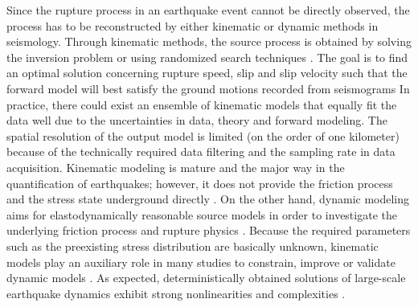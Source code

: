 \documentclass[%
 aip,
rsi,%
 amsmath,amssymb,
 reprint,%
]{revtex4-1}
\begin{document}
Since the rupture process in an earthquake event cannot be directly observed, the process has to be reconstructed by either kinematic or dynamic methods in seismology.
Through kinematic methods, the source process is obtained by solving the inversion problem or using randomized search techniques \cite{monelli_bayesian_2008}.
The goal is to find an optimal solution concerning rupture speed, slip and slip velocity such that the forward model will best satisfy the ground motions recorded from seismograms \cite{olson_finite_1982, haskell_elastic_1969, ozgun_konca_kinematic_2013}
In practice, there could exist an ensemble of kinematic models that equally fit the data well due to the uncertainties in data, theory and forward modeling\cite{monelli_bayesian_2008, peyrat_nonlinear_2004}.
The spatial resolution of the output model is limited (on the order of one kilometer) because of the technically required data filtering and the sampling rate in data acquisition\cite{hartzell_inversion_1983,madariaga_seismic_2007,madariaga_earthquake_2002,wald_rupture_1991}.
Kinematic modeling is mature and the major way in the quantification of earthquakes\cite{madariaga_earthquake_2002,ide_4.09-slip_2015}; however, it does not provide the friction process and the stress state underground directly \cite{peyrat_nonlinear_2004}.
On the other hand, dynamic modeling aims for elastodynamically reasonable source models in order to investigate the underlying friction process and rupture physics \cite{ide_4.09-slip_2015}.
Because the required parameters such as the preexisting stress distribution are basically unknown, kinematic models play an auxiliary role in many studies to constrain, improve or validate dynamic models \cite{wen_dynamic_2012,peyrat_nonlinear_2004,mikumo_stress-breakdown_2003, olsen_three-dimensional_1997}.
As expected, deterministically obtained solutions of large-scale earthquake dynamics exhibit strong nonlinearities and complexities \cite{peyrat_nonlinear_2004,olsen_three-dimensional_1997}.
\end{document}
